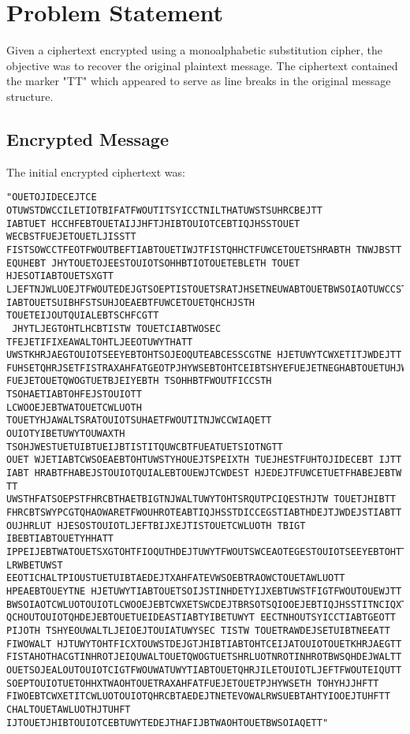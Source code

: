 \documentclass[12pt,a4paper]{article}
\begin{document}
\section{Problem Statement}

Given a ciphertext encrypted using a monoalphabetic substitution cipher, the objective was to recover the original plaintext message. The ciphertext contained the marker "TT" which appeared to serve as line breaks in the original message structure.

\subsection{Encrypted Message}

The initial encrypted ciphertext was:

\begin{lstlisting}
"OUETOJIDECEJTCE OTUWSTDWCCILETIOTBIFATFWOUTITSYICCTNILTHATUWSTSUHRCBEJTT
IABTUET HCCHFEBTOUETAIJJHFTJHIBTOUIOTCEBTIQJHSSTOUET WECBSTFUEJETOUETLJISSTT
FISTSOWCCTFEOTFWOUTBEFTIABTOUETIWJTFISTQHHCTFUWCETOUETSHRABTH TNWJBSTT
EQUHEBT JHYTOUETOJEESTOUIOTSOHHBTIOTOUETEBLETH TOUET HJESOTIABTOUETSXGTT
LJEFTNJWLUOEJTFWOUTEDEJGTSOEPTISTOUETSRATJHSETNEUWABTOUETBWSOIAOTUWCCSTT
IABTOUETSUIBHFSTSUHJOEAEBTFUWCETOUETQHCHJSTH TOUETEIJOUTQUIALEBTSCHFCGTT
 JHYTLJEGTOHTLHCBTISTW TOUETCIABTWOSEC TFEJETIFIXEAWALTOHTLJEEOTUWYTHATT
UWSTKHRJAEGTOUIOTSEEYEBTOHTSOJEOQUTEABCESSCGTNE HJETUWYTCWXETITJWDEJTT
FUHSETQHRJSETFISTRAXAHFATGEOTPJHYWSEBTOHTCEIBTSHYEFUEJETNEGHABTOUETUHJWMHATT
FUEJETOUETQWOGTUETBJEIYEBTH TSOHHBTFWOUTFICCSTH TSOHAETIABTOHFEJSTOUIOTT
LCWOOEJEBTWATOUETCWLUOTH TOUETYHJAWALTSRATOUIOTSUHAETFWOUTITNJWCCWIAQETT
OUIOTYIBETUWYTOUWAXTH TSOHJWESTUETUIBTUEIJBTISTITQUWCBTFUEATUETSIOTNGTT
OUET WJETIABTCWSOEAEBTOHTUWSTYHOUEJTSPEIXTH TUEJHESTFUHTOJIDECEBT IJTT
IABT HRABTFHABEJSTOUIOTQUIALEBTOUEWJTCWDEST HJEDEJTFUWCETUETFHABEJEBTW TT
UWSTHFATSOEPSTFHRCBTHAETBIGTNJWALTUWYTOHTSRQUTPCIQESTHJTW TOUETJHIBTT
FHRCBTSWYPCGTQHAOWARETFWOUHROTEABTIQJHSSTDICCEGSTIABTHDEJTJWDEJSTIABTT
OUJHRLUT HJESOSTOUIOTLJEFTBIJXEJTISTOUETCWLUOTH TBIGT IBEBTIABTOUETYHHATT
IPPEIJEBTWATOUETSXGTOHTFIOQUTHDEJTUWYTFWOUTSWCEAOTEGESTOUIOTSEEYEBTOHTT
LRWBETUWST EEOTICHALTPIOUSTUETUIBTAEDEJTXAHFATEVWSOEBTRAOWCTOUETAWLUOTT
HPEAEBTOUEYTNE HJETUWYTIABTOUETSOIJSTINHDETYIJXEBTUWSTFIGTFWOUTOUEWJTT
BWSOIAOTCWLUOTOUIOTLCWOOEJEBTCWXETSWCDEJTBRSOTSQIOOEJEBTIQJHSSTITNCIQXTT
QCHOUTOUIOTQHDEJEBTOUETUEIDEASTIABTYIBETUWYT EECTNHOUTSYICCTIABTGEOTT
PIJOTH TSHYEOUWALTLJEIOEJTOUIATUWYSEC TISTW TOUETRAWDEJSETUIBTNEEATT
FIWOWALT HJTUWYTOHTFICXTOUWSTDEJGTJHIBTIABTOHTCEIJATOUIOTOUETKHRJAEGTT
FISTAHOTHACGTINHROTJEIQUWALTOUETQWOGTUETSHRLUOTNROTINHROTBWSQHDEJWALTT
OUETSOJEALOUTOUIOTCIGTFWOUWATUWYTIABTOUETQHRJILETOUIOTLJEFTFWOUTEIQUTT
SOEPTOUIOTUETOHHXTWAOHTOUETRAXAHFATFUEJETOUETPJHYWSETH TOHYHJJHFTT
FIWOEBTCWXETITCWLUOTOUIOTQHRCBTAEDEJTNETEVOWALRWSUEBTAHTYIOOEJTUHFTT
CHALTOUETAWLUOTHJTUHFT IJTOUETJHIBTOUIOTCEBTUWYTEDEJTHAFIJBTWAOHTOUETBWSOIAQETT"
\end{lstlisting}
\end{document}
